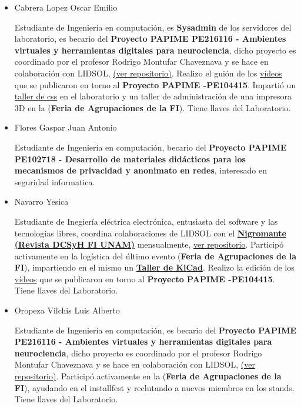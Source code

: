 \documentclass[a4paper,11pt]{article}                 %
\begin{document}
\begin{itemize}
    \item Cabrera Lopez Oscar Emilio 
    
    Estudiante de Ingeniería en computación, es \textbf{Sysadmin} de los servidores del laboratorio, es becario del \textbf{Proyecto PAPIME PE216116 - Ambientes virtuales y herramientas digitales para neurociencia}, dicho proyecto es coordinado por el profesor Rodrigo Montufar Chaveznava y se hace en colaboración con LIDSOL, \href{https://github.com/LIDSOL/portia}{(ver repositorio)}. Realizo el guión de los \href{https://www.youtube.com/channel/UCwHFqMqxUcCAJSdek3e4zOw}{vídeos} que se publicaron en torno al  \textbf{Proyecto PAPIME -PE104415}. Impartió un \href{https://lidsol.org/talleres/0002_css_basico.html}{taller de css} en el laboratorio y un taller de administración de una impresora 3D en la (\textbf{Feria de Agrupaciones de la FI}). Tiene llaves del Laboratorio.
    
    \item Flores Gaspar Juan Antonio
    
    Estudiante de Ingeniería en computación, becario del \textbf{Proyecto PAPIME PE102718 - Desarrollo de materiales didácticos para los mecanismos de privacidad y anonimato en redes}, interesado en seguridad informatica. 
    

    \item Navarro Yesica 
    
    Estudiante de Inegiería eléctrica electrónica, entusiasta del software y las tecnologías libres, coordina colaboraciones de LIDSOL con el \href{https://issuu.com/nigromantefi}{\textbf{Nigromante  (Revista DCSyH FI  UNAM)}} mensualmente, \href{https://github.com/LIDSOL/material-didactico/tree/master/nigromante}{ver repositorio}. Participó activamente en la logística del último evento (\textbf{Feria de Agrupaciones de la FI}),  impartiendo en el mismo un \href{https://github.com/yesn7/taller-kicad/}{\textbf{Taller de KiCad}}. Realizo la edición de los \href{https://www.youtube.com/channel/UCwHFqMqxUcCAJSdek3e4zOw}{vídeos} que se publicaron en torno al  \textbf{Proyecto PAPIME -PE104415}. Tiene llaves del Laboratorio.
    
    \item Oropeza Vilchis Luis Alberto
    
    Estudiante de Ingeniería en computación, es becario del \textbf{Proyecto PAPIME PE216116 - Ambientes virtuales y herramientas digitales para neurociencia}, dicho proyecto es coordinado por el profesor Rodrigo Montufar Chaveznava y se hace en colaboración con LIDSOL, \href{https://github.com/LIDSOL/portia}{(ver repositorio)}. Participó activamente en la (\textbf{Feria de Agrupaciones de la FI}), ayudando en el installfest y reclutando a nuevos miembros en los stands. Tiene llaves del Laboratorio.
    

\end{itemize}
\end{document}

